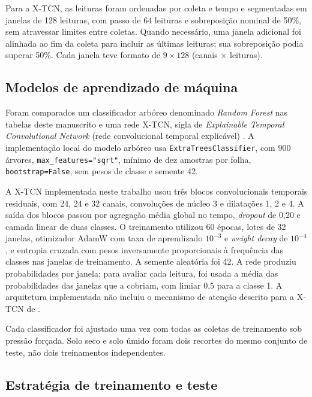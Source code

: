 Para a X-TCN, as leituras foram ordenadas por coleta e tempo e segmentadas
em janelas de 128 leituras, com passo de 64 leituras e sobreposição nominal
de 50\%, sem atravessar limites entre coletas. Quando necessário, uma
janela adicional foi alinhada ao fim da coleta para incluir as últimas
leituras; sua sobreposição podia superar 50\%. Cada janela teve formato de
$9\times128$ (canais $\times$ leituras).


\subsection{Modelos de aprendizado de máquina}
\label{subsec:modelos}

Foram comparados um classificador arbóreo denominado \emph{Random Forest}
nas tabelas deste manuscrito e uma rede X-TCN, sigla de \emph{Explainable
Temporal Convolutional Network} (rede convolucional temporal explicável)
\cite{chen2026xtcn}. A implementação local do modelo arbóreo usa
\texttt{ExtraTreesClassifier}, com 900 árvores,
\texttt{max\_features="sqrt"}, mínimo de dez amostras por folha,
\texttt{bootstrap=False}, sem pesos de classe e semente 42.


A X-TCN implementada neste trabalho usou três blocos convolucionais
temporais residuais, com 24, 24 e 32 canais, convoluções de núcleo 3 e
dilatações 1, 2 e 4. A saída dos blocos passou por agregação média global
no tempo, \emph{dropout} de 0,20 e camada linear de duas classes. O
treinamento utilizou 60 épocas, lotes de 32 janelas, otimizador AdamW com
taxa de aprendizado $10^{-3}$ e \emph{weight decay} de $10^{-4}$, e
entropia cruzada com pesos inversamente proporcionais à frequência das
classes nas janelas de treinamento. A semente aleatória foi 42. A rede
produziu probabilidades por janela; para avaliar cada leitura, foi usada
a média das probabilidades das janelas que a cobriam, com limiar 0,5 para
a classe 1. A arquitetura implementada não incluiu o mecanismo de atenção
descrito para a X-TCN de \cite{chen2026xtcn}.

Cada classificador foi ajustado uma vez com todas as coletas de treinamento
sob pressão forçada. Solo seco e solo úmido foram dois recortes do mesmo
conjunto de teste, não dois treinamentos independentes.

\subsection{Estratégia de treinamento e teste}
\label{subsec:treinamento_teste}

